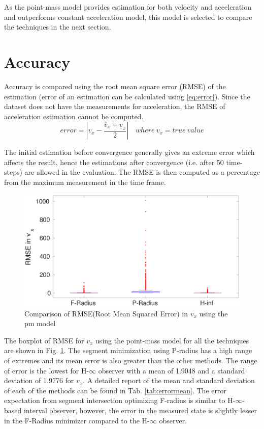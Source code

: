 As the point-mass model provides estimation for both velocity and acceleration and outperforms constant acceleration model, this model is selected to compare the techniques in the next section.

\section{Accuracy}
Accuracy is compared using the root mean square error (RMSE) of the estimation (error of an estimation can be calculated using \eqref{eq:error}). Since the dataset does not have the measurements for acceleration, the RMSE of acceleration estimation cannot be computed.
\begin{equation}\label{eq:error}
error = \left | v_x - \frac{\overline{v}_x + \underline{v}_x}{2} \right | 
\quad where~ v_x = true~value
\end{equation}

The initial estimation before convergence generally gives an extreme error which affects the result, hence the estimations after convergence (i.e. after 50 time-steps) are allowed in the evaluation. The RMSE is then computed as a percentage from the maximum measurement in the time frame.

\begin{figure}[h]
\centering
\includegraphics[width=\linewidth]{figures/Error/boxplotall}
\caption{Comparison of RMSE(Root Mean Squared Error) in $v_x$ using the pm model}
\label{fig:boxplot}
\end{figure}

The boxplot of RMSE for $v_x$ using the point-mass model for all the techniques are shown in Fig. \ref{fig:boxplot}. The segment minimization using P-radius has a high range of extremes and its mean error is also greater than the other methods. The range of error is the lowest for H-$\infty$ observer with a mean of 1.9048 and a standard deviation of 1.9776 for $v_x$. A detailed report of the mean and standard deviation of each of the methods can be found in Tab. \ref{tab:errormean}. The error expectation from segment intersection optimizing F-radius is similar to H-$\infty$-based interval observer, however, the error in the measured state is slightly lesser in the F-Radius minimizer compared to the H-$\infty$ observer.


